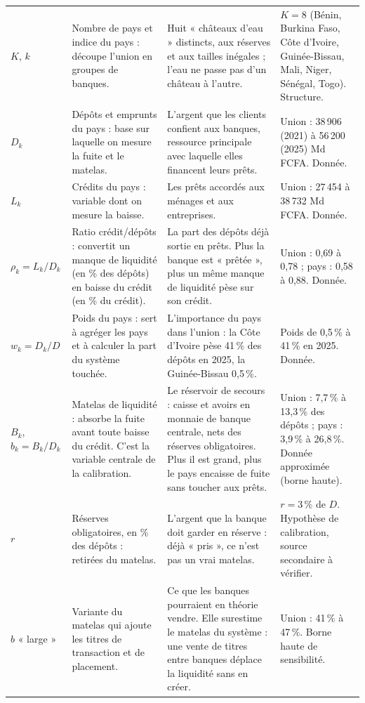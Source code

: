 \documentclass[11pt,a4paper]{article}
\begin{document}
{\begin{longtable}{>{\raggedright\arraybackslash}p{2.0cm}>{\raggedright\arraybackslash}p{4.1cm}>{\raggedright\arraybackslash}p{5.4cm}>{\raggedright\arraybackslash}p{3.8cm}}
			\multicolumn{4}{l}{\textbf{A. Structure et données observées}}\\
			\midrule
			$K$, $k$ & Nombre de pays et indice du pays : découpe l'union en groupes de banques. & Huit « châteaux d'eau » distincts, aux réserves et aux tailles inégales ; l'eau ne passe pas d'un château à l'autre. & $K=8$ (Bénin, Burkina Faso, Côte d'Ivoire, Guinée-Bissau, Mali, Niger, Sénégal, Togo). Structure. \\
			\addlinespace
			$D_k$ & Dépôts et emprunts du pays : base sur laquelle on mesure la fuite et le matelas. & L'argent que les clients confient aux banques, ressource principale avec laquelle elles financent leurs prêts. & Union : 38\,906 (2021) à 56\,200 (2025) Md FCFA. Donnée. \\
			\addlinespace
			$L_k$ & Crédits du pays : variable dont on mesure la baisse. & Les prêts accordés aux ménages et aux entreprises. & Union : 27\,454 à 38\,732 Md FCFA. Donnée. \\
			\addlinespace
			$\rho_k=L_k/D_k$ & Ratio crédit/dépôts : convertit un manque de liquidité (en \% des dépôts) en baisse du crédit (en \% du crédit). & La part des dépôts déjà sortie en prêts. Plus la banque est « prêtée », plus un même manque de liquidité pèse sur son crédit. & Union : 0,69 à 0,78 ; pays : 0,58 à 0,88. Donnée. \\
			\addlinespace
			$w_k=D_k/D$ & Poids du pays : sert à agréger les pays et à calculer la part du système touchée. & L'importance du pays dans l'union : la Côte d'Ivoire pèse 41\,\% des dépôts en 2025, la Guinée-Bissau 0,5\,\%. & Poids de 0,5\,\% à 41\,\% en 2025. Donnée. \\
			\addlinespace
			$B_k$, $b_k=B_k/D_k$ & Matelas de liquidité : absorbe la fuite avant toute baisse du crédit. C'est la variable centrale de la calibration. & Le réservoir de secours : caisse et avoirs en monnaie de banque centrale, nets des réserves obligatoires. Plus il est grand, plus le pays encaisse de fuite sans toucher aux prêts. & Union : 7,7\,\% à 13,3\,\% des dépôts ; pays : 3,9\,\% à 26,8\,\%. Donnée approximée (borne haute). \\
			\addlinespace
			$r$ & Réserves obligatoires, en \% des dépôts : retirées du matelas. & L'argent que la banque doit garder en réserve : déjà « pris », ce n'est pas un vrai matelas. & $r=3\,\%$ de $D$. Hypothèse de calibration, source secondaire à vérifier. \\
			\addlinespace
			$b$ « large » & Variante du matelas qui ajoute les titres de transaction et de placement. & Ce que les banques pourraient en théorie vendre. Elle surestime le matelas du système : une vente de titres entre banques déplace la liquidité sans en créer. & Union : 41\,\% à 47\,\%. Borne haute de sensibilité. \\

\end{longtable}}
\end{document}
